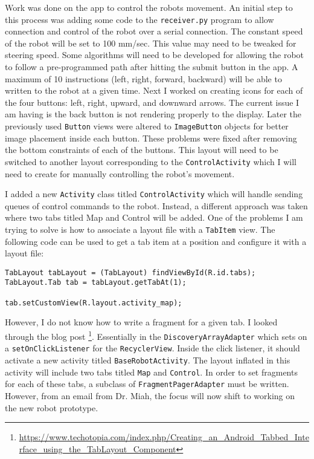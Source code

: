 \documentclass[fontsize=11pt, %
                             paper=a4, %
                             twoside, %
                             captions=tableheading,
                             index=totoc,
                             hyperref]{labbook}
\begin{document}
\begin{addmargin}[0cm]{0cm}
Work was done on the app to control the robots movement. An initial step to this process was adding some code to the \texttt{receiver.py} program to allow connection and control of the robot over a serial connection. The constant speed of the robot will be set to 100 mm/sec. This value may need to be tweaked for steering speed. Some algorithms will need to be developed for allowing the robot to follow a pre-programmed path after hitting the submit button in the app. A maximum of 10 instructions (left, right, forward, backward) will be able to written to the robot at a given time. Next I worked on creating icons for each of the four buttons: left, right, upward, and downward arrows. The current issue I am having is the back button is not rendering properly to the display. Later the previously used \texttt{Button} views were altered to \texttt{ImageButton} objects for better image placement inside each button. These problems were fixed after removing the bottom constraints of each of the buttons. This layout will need to be switched to another layout corresponding to the \texttt{ControlActivity} which I will need to create for manually controlling the robot's movement.

I added a new \texttt{Activity} class titled \texttt{ControlActivity} which will handle sending queues of control commands to the robot. Instead, a different approach was taken where two tabs titled Map and Control will be added. One of the problems I am trying to solve is how to associate a layout file with a \texttt{TabItem} view. The following code can be used to get a tab item at a position and configure it with a layout file:
\begin{Verbatim}
TabLayout tabLayout = (TabLayout) findViewById(R.id.tabs);
TabLayout.Tab tab = tabLayout.getTabAt(1);

tab.setCustomView(R.layout.activity_map);
\end{Verbatim}
However, I do not know how to write a fragment for a given tab. I looked through the blog post \footnote{\url{https://www.techotopia.com/index.php/Creating_an_Android_Tabbed_Interface_using_the_TabLayout_Component}}. Essentially in the \texttt{DiscoveryArrayAdapter} which sets on a \texttt{setOnClickListener} for the \texttt{RecyclerView}. Inside the click listener, it should activate a new activity titled \texttt{BaseRobotActivity}. The layout inflated in this activity will include two tabs titled \texttt{Map} and \texttt{Control}. In order to set fragments for each of these tabs, a subclass of \texttt{FragmentPagerAdapter} must be written. 
\medbreak\noindent
However, from an email from Dr. Miah, the focus will now shift to working on the new robot prototype.


\end{addmargin}
\end{document}
